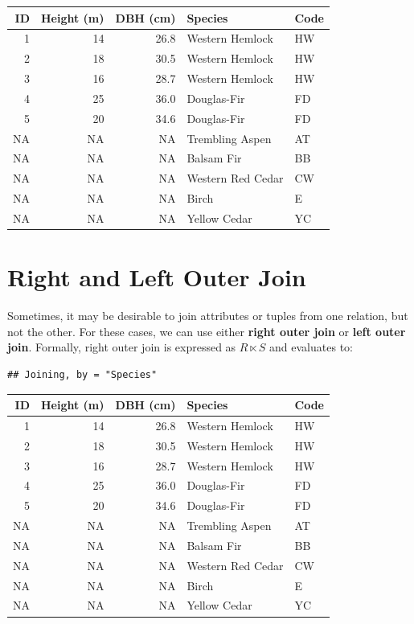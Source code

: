 \documentclass[
]{book}
\begin{document}
\begin{tabular}{rrrll}
\toprule
ID & Height (m) & DBH (cm) & Species & Code\\
\midrule
1 & 14 & 26.8 & Western Hemlock & HW\\
2 & 18 & 30.5 & Western Hemlock & HW\\
3 & 16 & 28.7 & Western Hemlock & HW\\
4 & 25 & 36.0 & Douglas-Fir & FD\\
5 & 20 & 34.6 & Douglas-Fir & FD\\
\addlinespace
NA & NA & NA & Trembling Aspen & AT\\
NA & NA & NA & Balsam Fir & BB\\
NA & NA & NA & Western Red Cedar & CW\\
NA & NA & NA & Birch & E\\
NA & NA & NA & Yellow Cedar & YC\\
\bottomrule
\end{tabular}

\hypertarget{right-and-left-outer-join}{%
\section{Right and Left Outer Join}\label{right-and-left-outer-join}}

Sometimes, it may be desirable to join attributes or tuples from one relation, but not the other. For these cases, we can use either \textbf{right outer join} or \textbf{left outer join}. Formally, right outer join is expressed as \(R⋉S\) and evaluates to:

\begin{verbatim}
## Joining, by = "Species"
\end{verbatim}

\begin{tabular}{rrrll}
\toprule
ID & Height (m) & DBH (cm) & Species & Code\\
\midrule
1 & 14 & 26.8 & Western Hemlock & HW\\
2 & 18 & 30.5 & Western Hemlock & HW\\
3 & 16 & 28.7 & Western Hemlock & HW\\
4 & 25 & 36.0 & Douglas-Fir & FD\\
5 & 20 & 34.6 & Douglas-Fir & FD\\
\addlinespace
NA & NA & NA & Trembling Aspen & AT\\
NA & NA & NA & Balsam Fir & BB\\
NA & NA & NA & Western Red Cedar & CW\\
NA & NA & NA & Birch & E\\
NA & NA & NA & Yellow Cedar & YC\\
\bottomrule
\end{tabular}
\end{document}
